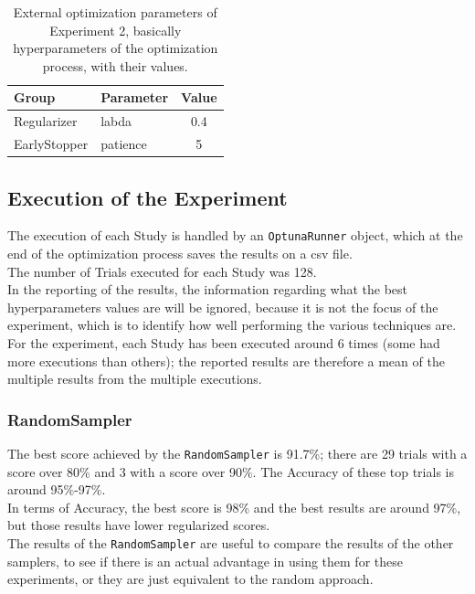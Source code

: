\begin{table}[ht!]
	\center
	\setlength{\tabcolsep}{0.5cm}
	\caption[Optimization External Parameters of Experiment 2]{External optimization parameters of Experiment 2, basically hyperparameters of the optimization process, with their values.}
	\begin{tabular}{@{}llc@{}}
		\toprule
		\textbf{Group} & \textbf{Parameter} & \textbf{Value} \\ \midrule
		Regularizer    & labda              & 0.4            \\[0.1cm]
		EarlyStopper   & patience           & 5              \\ \bottomrule
	\end{tabular}
	\label{tab:table-4.2.2}
\end{table}

\subsection{Execution of the Experiment}

The execution of each Study is handled by an \texttt{OptunaRunner} object, which at the end of the optimization process saves the results on a csv file.
\\[0.3cm]The number of Trials executed for each Study was 128.
\\[0.3cm]In the reporting of the results, the information regarding what the best hyperparameters values are will be ignored, because it is not the focus of the experiment, which is to identify how well performing the various techniques are.
\\[0.3cm]For the experiment, each Study has been executed around 6 times (some had more executions than others); the reported results are therefore a mean of the multiple results from the multiple executions. 

\subsubsection{RandomSampler}

The best score achieved by the \texttt{RandomSampler} is 91.7\%; there are 29 trials with a score over 80\% and 3 with a score over 90\%. The Accuracy of these top trials is around 95\%-97\%.
\\[0.3cm]In terms of Accuracy, the best score is 98\% and the best results are around 97\%, but those results have lower regularized scores.
\\[0.3cm]The results of the \texttt{RandomSampler} are useful to compare the results of the other samplers, to see if there is an actual advantage in using them for these experiments, or they are just equivalent to the random approach.

